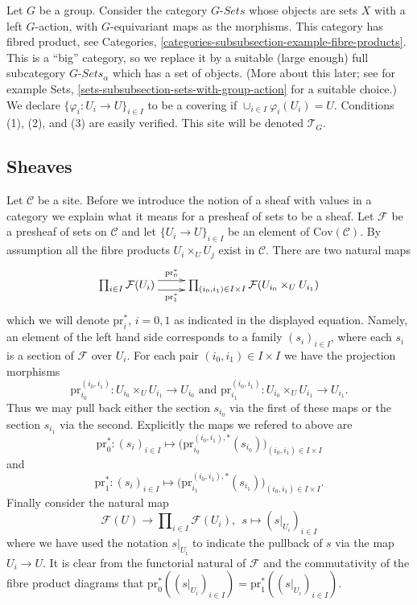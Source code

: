 \begin{example}
\label{example-site-on-group}
Let $G$ be a group. Consider the category $G\textit{-Sets}$
whose objects are sets $X$ with a left $G$-action, with
$G$-equivariant maps as the morphisms. This category has
fibred product, see Categories,
\autoref{categories-subsubsection-example-fibre-products}.
This is a ``big'' category, so we replace it by a suitable
(large enough) full subcategory $G\textit{-Sets}_\alpha$ which
has a set of objects. (More about this later; see for example Sets,
\autoref{sets-subsubsection-sets-with-group-action} for a suitable
choice.) We declare $\{\varphi_i : U_i \to U\}_{i\in I}$ to be 
a covering if $\cup_{i\in I} \varphi_i(U_i) = U$.
Conditions (1), (2), and (3) are easily verified.
This site will be denoted $\mathcal{T}_G$.
\end{example}

\subsection{Sheaves}
\label{subsection-sheaves}

\noindent
Let $\mathcal{C}$ be a site. Before we introduce the notion of
a sheaf with values in a category we explain what it means
for a presheaf of sets to be a sheaf. Let $\mathcal{F}$ be
a presheaf of sets on $\mathcal{C}$ and let
$\{U_i \to U\}_{i\in I}$ be an element of $\text{Cov}(\mathcal{C})$.
By assumption all the fibre products $U_i\times_U U_j$ exist
in $\mathcal{C}$. There are two natural maps
$$
\xymatrix{
\prod\nolimits_{i\in I}
\mathcal{F}(U_i)
\ar@<1ex>[r]^-{\text{pr}_0^*} \ar@<-1ex>[r]_-{\text{pr}_1^*}
&
\prod\nolimits_{(i_0, i_1) \in I\times I}
\mathcal{F}(U_{i_0}\times_U U_{i_1})
}
$$
which we will denote $\text{pr}^*_i$, $i=0,1$ as indicated
in the displayed equation.
Namely, an element of the left hand side corresponds to a
family $(s_i)_{i\in I}$, where each $s_i$ is a section of
$\mathcal{F}$ over $U_i$. For each pair $(i_0, i_1) \in I\times I$
we have the projection morphisms
$$
\text{pr}^{(i_0, i_1)}_{i_0} : 
U_{i_0}\times_U U_{i_1}
\longrightarrow
U_{i_0}
\text{ and }
\text{pr}^{(i_0, i_1)}_{i_1} : 
U_{i_0}\times_U U_{i_1}
\longrightarrow
U_{i_1}.
$$
Thus we may pull back either the section $s_{i_0}$ via
the first of these maps or the section $s_{i_1}$ via the
second. Explicitly the maps we refered to above are
$$
\text{pr}_0^* :
(s_i)_{i\in I}
\longmapsto
\Big(
\text{pr}^{(i_0, i_1), *}_{i_0}(s_{i_0})
\Big)_{(i_0, i_1) \in I\times I}
$$
and
$$
\text{pr}_1^* :
(s_i)_{i\in I}
\longmapsto
\Big(
\text{pr}^{(i_0, i_1), *}_{i_1}(s_{i_1})
\Big)_{(i_0, i_1) \in I\times I}.
$$
Finally consider the natural map
$$
\mathcal{F}(U)
\longrightarrow
\prod\nolimits_{i\in I}
\mathcal{F}(U_i)
,\ \ 
s
\longmapsto
(s|_{U_i})_{i \in I}
$$
where we have used the notation $s|_{U_i}$ to indicate the
pullback of $s$ via the map $U_i \to U$. It is clear from the
functorial natural of $\mathcal{F}$ and the commutativity
of the fibre product diagrams that
$\text{pr}_0^*( (s|_{U_i})_{i \in I} ) =
\text{pr}_1^*( (s|_{U_i})_{i \in I} )$.

